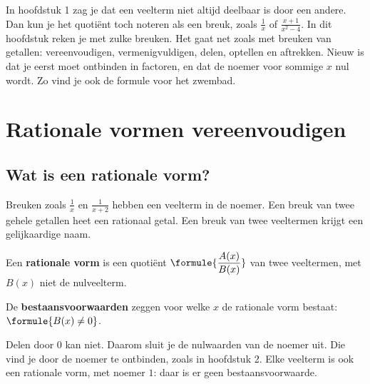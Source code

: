 In hoofdstuk 1 zag je dat een veelterm niet altijd deelbaar is door een andere. Dan kun je het quotiënt toch noteren als een breuk, zoals $\tfrac{1}{x}$ of $\tfrac{x + 1}{x^2 - 4}$. In dit hoofdstuk reken je met zulke breuken. Het gaat net zoals met breuken van getallen: vereenvoudigen, vermenigvuldigen, delen, optellen en aftrekken. Nieuw is dat je eerst moet ontbinden in factoren, en dat de noemer voor sommige $x$ nul wordt. Zo vind je ook de formule voor het zwembad.

\begin{oefeningen}[Start]

\end{oefeningen}

\section{Rationale vormen vereenvoudigen}

\subsection{Wat is een rationale vorm?}

Breuken zoals $\tfrac{1}{x}$ en $\tfrac{1}{x + 2}$ hebben een veelterm in de noemer. Een breuk van twee gehele getallen heet een rationaal getal. Een breuk van twee veeltermen krijgt een gelijkaardige naam.

\begin{theorie}
Een \textbf{\textcolor{accent}{rationale vorm}} is een quotiënt $\formule{\dfrac{A(x)}{B(x)}}$ van twee veeltermen, met $B(x)$ niet de nulveelterm.

De \textbf{\textcolor{accent}{bestaansvoorwaarden}} zeggen voor welke $x$ de rationale vorm bestaat: $\formule{B(x) \neq 0}$.
\end{theorie}

Delen door $0$ kan niet. Daarom sluit je de nulwaarden van de noemer uit. Die vind je door de noemer te ontbinden, zoals in hoofdstuk 2. Elke veelterm is ook een rationale vorm, met noemer $1$: daar is er geen bestaansvoorwaarde.


